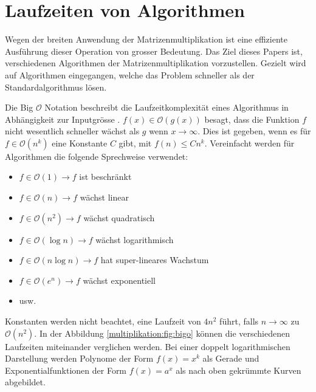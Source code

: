 %
%
%
\section{Laufzeiten von Algorithmen}
Wegen der breiten Anwendung der Matrizenmultiplikation ist eine effiziente Ausführung dieser Operation von grosser Bedeutung.
Das Ziel dieses Papers ist, verschiedenen Algorithmen der Matrizenmultiplikation vorzustellen.
Gezielt wird auf Algorithmen eingegangen, welche das Problem schneller als der Standardalgorithmus l\"osen.

\label{muliplikation:sec:bigo}
Die Big $\mathcal{O}$ Notation beschreibt die Laufzeitkomplexit\"at eines Algorithmus in Abhängigkeit zur Inputgrösse \cite{multiplikation:bigo}.
$f(x) \in \mathcal{O}(g(x))$ besagt, dass die Funktion $f$ nicht wesentlich schneller w\"achst als $g$ wenn $x \rightarrow \infty$.
Dies ist gegeben, wenn es für $f \in \mathcal{O}(n^k)$ eine Konstante $C$ gibt, mit $f(n) \leq Cn^k$.
Vereinfacht werden f\"ur Algorithmen die folgende Sprechweise verwendet:
\begin{itemize}
	\item $f \in \mathcal{O}(1) \rightarrow f$ ist beschr\"ankt
	\item $f \in \mathcal{O}(n) \rightarrow f$ w\"achst linear
	\item $f \in \mathcal{O}  (n^2   ) \rightarrow f$ w\"achst quadratisch
	\item $f \in \mathcal{O}(\log n) \rightarrow f$ w\"achst logarithmisch
	\item $f \in \mathcal{O}(n \log n) \rightarrow f$ hat super-lineares Wachstum
	\item $f \in \mathcal{O}  (e^n   ) \rightarrow f$ w\"achst exponentiell
	\item usw.
\end{itemize}

Konstanten werden nicht beachtet, eine Laufzeit von  $4n^2$ führt, falls $n \rightarrow \infty$ zu $\mathcal{O}(n^2)$.
In der Abbildung \ref{multiplikation:fig:bigo} k\"onnen die verschiedenen Laufzeiten miteinander verglichen werden.
Bei einer doppelt logarithmischen Darstellung werden Polynome der Form $f(x) = x^k$ als Gerade und Exponentialfunktionen der Form $f(x) = a^x$ als nach oben gekr\"ummte Kurven abgebildet.



